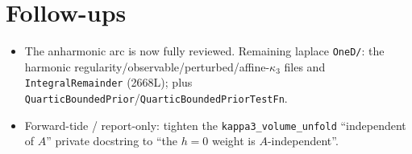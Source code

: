 \documentclass[11pt]{article}
\begin{document}
\section{Follow-ups}
\begin{itemize}[noitemsep]
  \item The anharmonic arc is now fully reviewed. Remaining laplace \texttt{OneD/}: the harmonic
    regularity/observable/perturbed/affine-$\kappa_3$ files and \texttt{IntegralRemainder} (2668L);
    plus \texttt{QuarticBoundedPrior}/\texttt{QuarticBoundedPriorTestFn}.
  \item Forward-tide / report-only: tighten the \texttt{kappa3\_volume\_unfold} ``independent of
    $A$'' private docstring to ``the $h=0$ weight is $A$-independent''.
\end{itemize}
\end{document}
